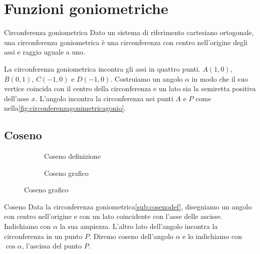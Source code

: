 \section{Funzioni goniometriche}
\label{sec:FunzioniGoniometriche}
\begin{definizionet}{Circonferenza goniometrica}{}
	Dato un sistema di riferimento cartesiano ortogonale, una circonferenza goniometrica è una circonferenza con centro nell'origine degli assi e raggio uguale a uno. 
\end{definizionet}
 La circonferenza goniometrica incontra gli assi in quattro punti. $A(1,0)$, $B(0,1)$, $C(-1,0)$ e $D(-1,0)$. Costruiamo un angolo $\alpha$ in modo che il suo vertice coincida con il centro della circonferenza e un lato sia la semiretta positiva dell'asse $x$. L'angolo incontra la circonferenza nei punti $A$ e $P$ come nella\nobs\vref{fig:circonferenzagonimetricagonio}. 
\subsection{Coseno}
\label{sec:cosenogonio}
\begin{figure}
	\begin{subfigure}[b]{.5\linewidth}
		\centering
		
		\caption{Coseno definizione}\label{sub:cosenodef}
	\end{subfigure}%
	\begin{subfigure}[b]{.5\linewidth}
	\centering
		
		\caption{Coseno grafico}\label{sub:cosenograf}
	\end{subfigure}
	\label{ztzcos}
\end{figure}
\begin{definizionet}{Coseno}{}
Data la circonferenza goniometrica\nobs\vref{sub:cosenodef}, disegniamo un angolo con centro nell'origine e con un lato coincidente con l'asse delle ascisse. Indichiamo con $\alpha$ la sua ampiezza. L'altro lato dell'angolo incontra la circonferenza in un punto $P$. Diremo coseno dell'angolo $\alpha$ e lo indichiamo con $\cos\alpha$, l'ascissa del punto $P$.
\end{definizionet}
